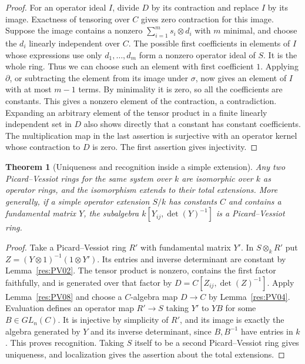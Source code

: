 \documentclass[11pt,oneside,openany]{book}
\newtheorem{theorem}{Theorem}[chapter]
\theoremstyle{definition}
\theoremstyle{remark}
\begin{document}
\begin{proof}
For an operator ideal \(I\), divide \(D\) by its contraction and
replace \(I\) by its image. Exactness of tensoring over \(C\) gives
zero contraction for this image. Suppose the image contains a
nonzero \(\sum_{i=1}^m s_i\otimes d_i\) with \(m\) minimal,
and choose the \(d_i\) linearly independent over \(C\).
The possible first coefficients in elements of \(I\) whose
expressions use only \(d_1,\dots,d_m\) form a nonzero operator
ideal of \(S\). It is the whole ring. Thus we can choose such
an element with first coefficient \(1\). Applying \(\partial\),
or subtracting the element from its image under \(\sigma\), now
gives an element of \(I\) with at most \(m-1\) terms. By minimality
it is zero, so all the coefficients are constants. This gives
a nonzero element of the contraction, a contradiction.
Expanding an arbitrary element of the tensor product in a finite
linearly independent set in \(D\) also shows directly that a
constant has constant coefficients. The multiplication map in
the last assertion is surjective with an operator kernel
whose contraction to \(D\) is zero. The first assertion gives
injectivity.
\end{proof}

\begin{theorem}[Uniqueness and recognition inside a simple extension]
\label{res:PV09}
Any two Picard--Vessiot rings for the same system over \(k\) are
isomorphic over \(k\) as operator rings, and the isomorphism
extends to their total extensions. More generally, if a simple
operator extension \(S/k\) has constants \(C\) and contains a
fundamental matrix \(Y\), the subalgebra
\(k[Y_{ij},\det(Y)^{-1}]\) is a Picard--Vessiot ring.
\end{theorem}

\begin{proof}
Take a Picard--Vessiot ring \(R'\) with fundamental matrix \(Y'\).
In \(S\otimes_k R'\) put
\(Z=(Y\otimes1)^{-1}(1\otimes Y')\). Its entries and inverse
determinant are constant by Lemma~\ref{res:PV02}.
The tensor product is nonzero, contains the first factor faithfully,
and is generated over that factor by
\(D=C[Z_{ij},\det(Z)^{-1}]\). Apply Lemma~\ref{res:PV08}
and choose a \(C\)-algebra map \(D\to C\) by
Lemma~\ref{res:PV04}. Evaluation defines an operator map
\(R'\to S\) taking \(Y'\) to \(YB\) for some \(B\in GL_n(C)\).
It is injective by simplicity of \(R'\), and its image is
exactly the algebra generated by \(Y\) and its inverse
determinant, since \(B,B^{-1}\) have entries in \(k\).
This proves recognition. Taking \(S\) itself to be a second
Picard--Vessiot ring gives uniqueness, and localization gives
the assertion about the total extensions.
\end{proof}
\end{document}
